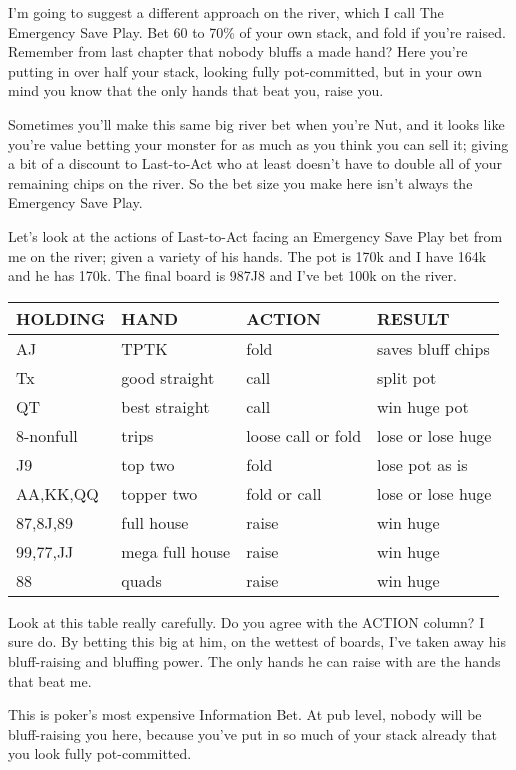 I'm going to suggest a different approach on the river, which I call
The Emergency Save Play. Bet 60 to 70\% of your own stack, and fold if
you're raised. Remember from last chapter that nobody bluffs a made
hand? Here you're putting in over half your stack, looking fully
pot-committed, but in your own mind you know that the only hands that
beat you, raise you.

Sometimes you'll make this same big river bet when you're Nut, and it
looks like you're value betting your monster for as much as you think
you can sell it; giving a bit of a discount to Last-to-Act who at
least doesn't have to double all of your remaining chips on the
river. So the bet size you make here isn't always the Emergency Save
Play.

Let's look at the actions of Last-to-Act facing an Emergency Save Play
bet from me on the river; given a variety of his hands. The pot is
170k and I have 164k and he has 170k. The final board is 987J8 and
I've bet 100k on the river.

\begin{tabular}{|l|l|l|l|} \hline
HOLDING & HAND & ACTION & RESULT\\ \hline
AJ      & TPTK & fold   & saves bluff chips\\ \hline
Tx      & good straight & call & split pot\\ \hline
QT      & best straight & call & win huge pot\\ \hline
8-nonfull & trips & loose call or fold & lose or lose huge\\ \hline
J9      & top two       & fold & lose pot as is\\ \hline
AA,KK,QQ & topper two   & fold or call & lose or lose huge\\ \hline
87,8J,89 & full house   & raise & win huge\\ \hline
99,77,JJ & mega full house & raise & win huge\\ \hline
88      & quads            & raise & win huge\\ \hline
\end{tabular}

Look at this table really carefully. Do you agree with the ACTION
column? I sure do. By betting this big at him, on the wettest of
boards, I've taken away his bluff-raising and bluffing power. The only
hands he can raise with are the hands that beat me.

This is poker's most expensive Information Bet. At pub level, nobody
will be bluff-raising you here, because you've put in so much of your
stack already that you look fully pot-committed.

